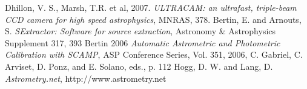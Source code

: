 \documentclass[a4paper,10pt]{article}
\begin{document}
\begin{thebibliography}{10}
	Dhillon, V. S., Marsh, T.R. et al, 2007. \emph{ULTRACAM: an ultrafast, triple-beam CCD camera for high speed astrophysics}, MNRAS, 378.
	Bertin, E. and {Arnouts}, S. \emph{SExtractor: Software for source extraction}, Astronomy \& Astrophysics Supplement 317, 393
	Bertin 2006 \emph{Automatic Astrometric and Photometric Calibration with SCAMP}, ASP Conference Series, Vol. 351, 2006, C. Gabriel, C. Arviset, D. Ponz, and E. Solano, eds., p. 112 
	Hogg, D. W. and Lang, D. \emph{Astrometry.net}, http://www.astrometry.net 
\end{thebibliography}
\end{document}
